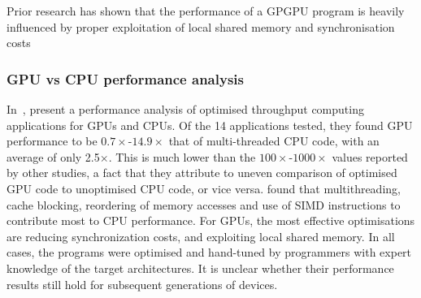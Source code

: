 Prior research has shown that the performance of a GPGPU program is
heavily influenced by proper exploitation of local shared memory and
synchronisation costs~\cite{Ryoo2008a, Lee2010} 




\subsubsection{GPU vs CPU performance analysis}

In~\cite{Lee2010}, \citeauthor{Lee2010} present a performance analysis
of optimised throughput computing applications for GPUs and CPUs. Of
the 14 applications tested, they found GPU performance to be
$0.7\times$-$14.9\times$ that of multi-threaded CPU code, with an
average of only 2.5$\times$. This is much lower than the
$100\times$-$1000\times$ values reported by other studies,
a fact that they attribute to uneven comparison of optimised GPU code
to unoptimised CPU code, or vice versa. \citeauthor{Lee2010} found
that multithreading, cache blocking, reordering of memory accesses and
use of SIMD instructions to contribute most to CPU performance. For
GPUs, the most effective optimisations are reducing synchronization
costs, and exploiting local shared memory. In all cases, the programs
were optimised and hand-tuned by programmers with expert knowledge of
the target architectures. It is unclear whether their performance
results still hold for subsequent generations of devices.


